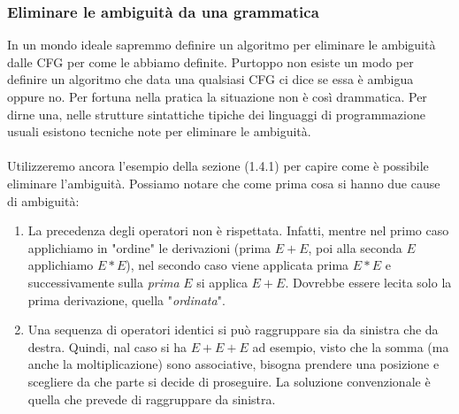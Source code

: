 \documentclass[11pt]{article}
\begin{document}
\subsubsection{Eliminare le ambiguità da una grammatica}
In un mondo ideale sapremmo definire un algoritmo per eliminare le ambiguità dalle CFG per come le abbiamo definite. Purtoppo non esiste un modo per definire un algoritmo che data una qualsiasi CFG ci dice se essa è ambigua oppure no. Per fortuna nella pratica la situazione non è così drammatica. Per dirne una, nelle strutture sintattiche tipiche dei linguaggi di programmazione usuali esistono tecniche note per eliminare le ambiguità.
\\ \\
Utilizzeremo ancora l'esempio della sezione (1.4.1) per capire come è possibile eliminare l'ambiguità.
Possiamo notare che come prima cosa si hanno due cause di ambiguità:
\begin{enumerate}
	\item La precedenza degli operatori non è rispettata. Infatti, mentre nel primo caso applichiamo in "ordine" le derivazioni (prima $E+E$, poi alla seconda $E$ applichiamo $E*E$), nel secondo caso viene applicata prima $E*E$ e successivamente sulla \textit{prima} $E$ si applica $E+E$. Dovrebbe essere lecita solo la prima derivazione, quella "\textit{ordinata}".
	\item Una sequenza di operatori identici si può raggruppare sia da sinistra che da destra. Quindi, nal caso si ha $E+E+E$ ad esempio, visto che la somma (ma anche la moltiplicazione) sono associative, bisogna prendere una posizione e scegliere da che parte si decide di proseguire. La soluzione convenzionale è quella che prevede di raggruppare da sinistra.
\end{enumerate}
\end{document}

